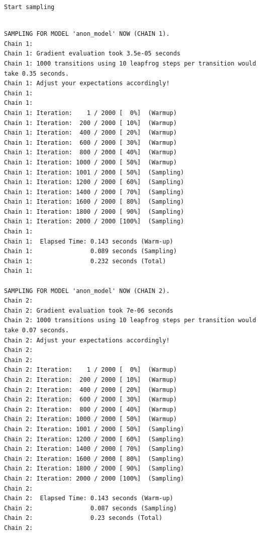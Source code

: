 \documentclass[
  letterpaper,
  DIV=11,
  numbers=noendperiod]{scrartcl}
\begin{document}
\begin{verbatim}
Start sampling
\end{verbatim}

\begin{verbatim}

SAMPLING FOR MODEL 'anon_model' NOW (CHAIN 1).
Chain 1: 
Chain 1: Gradient evaluation took 3.5e-05 seconds
Chain 1: 1000 transitions using 10 leapfrog steps per transition would take 0.35 seconds.
Chain 1: Adjust your expectations accordingly!
Chain 1: 
Chain 1: 
Chain 1: Iteration:    1 / 2000 [  0%]  (Warmup)
Chain 1: Iteration:  200 / 2000 [ 10%]  (Warmup)
Chain 1: Iteration:  400 / 2000 [ 20%]  (Warmup)
Chain 1: Iteration:  600 / 2000 [ 30%]  (Warmup)
Chain 1: Iteration:  800 / 2000 [ 40%]  (Warmup)
Chain 1: Iteration: 1000 / 2000 [ 50%]  (Warmup)
Chain 1: Iteration: 1001 / 2000 [ 50%]  (Sampling)
Chain 1: Iteration: 1200 / 2000 [ 60%]  (Sampling)
Chain 1: Iteration: 1400 / 2000 [ 70%]  (Sampling)
Chain 1: Iteration: 1600 / 2000 [ 80%]  (Sampling)
Chain 1: Iteration: 1800 / 2000 [ 90%]  (Sampling)
Chain 1: Iteration: 2000 / 2000 [100%]  (Sampling)
Chain 1: 
Chain 1:  Elapsed Time: 0.143 seconds (Warm-up)
Chain 1:                0.089 seconds (Sampling)
Chain 1:                0.232 seconds (Total)
Chain 1: 

SAMPLING FOR MODEL 'anon_model' NOW (CHAIN 2).
Chain 2: 
Chain 2: Gradient evaluation took 7e-06 seconds
Chain 2: 1000 transitions using 10 leapfrog steps per transition would take 0.07 seconds.
Chain 2: Adjust your expectations accordingly!
Chain 2: 
Chain 2: 
Chain 2: Iteration:    1 / 2000 [  0%]  (Warmup)
Chain 2: Iteration:  200 / 2000 [ 10%]  (Warmup)
Chain 2: Iteration:  400 / 2000 [ 20%]  (Warmup)
Chain 2: Iteration:  600 / 2000 [ 30%]  (Warmup)
Chain 2: Iteration:  800 / 2000 [ 40%]  (Warmup)
Chain 2: Iteration: 1000 / 2000 [ 50%]  (Warmup)
Chain 2: Iteration: 1001 / 2000 [ 50%]  (Sampling)
Chain 2: Iteration: 1200 / 2000 [ 60%]  (Sampling)
Chain 2: Iteration: 1400 / 2000 [ 70%]  (Sampling)
Chain 2: Iteration: 1600 / 2000 [ 80%]  (Sampling)
Chain 2: Iteration: 1800 / 2000 [ 90%]  (Sampling)
Chain 2: Iteration: 2000 / 2000 [100%]  (Sampling)
Chain 2: 
Chain 2:  Elapsed Time: 0.143 seconds (Warm-up)
Chain 2:                0.087 seconds (Sampling)
Chain 2:                0.23 seconds (Total)
Chain 2: 


\end{verbatim}
\end{document}
